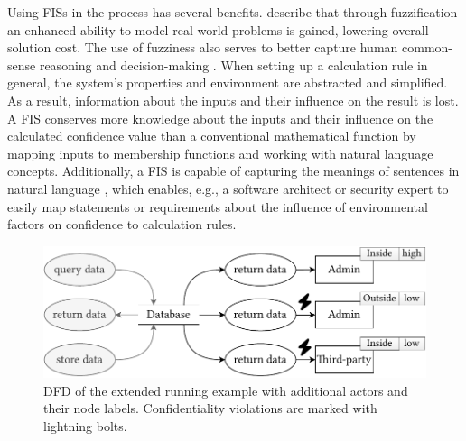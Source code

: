 Using \acp{FIS} in the process has several benefits. 
\textcite{klir_fuzzy_1995} describe that through fuzzification an enhanced ability to model real-world problems is gained, lowering overall solution cost. 
The use of fuzziness also serves to better capture human common-sense reasoning and decision-making \cite{klir_fuzzy_1995}. 
When setting up a calculation rule in general, the system's properties and environment are abstracted and simplified. 
As a result, information about the inputs and their influence on the result is lost. 
A \ac{FIS} conserves more knowledge about the inputs and their influence on the calculated confidence value than a conventional mathematical function by mapping inputs to membership functions and working with natural language concepts. 
Additionally, a \ac{FIS} is capable of capturing the meanings of sentences in natural language \cite{klir_fuzzy_1995}, which enables, e.g., a software architect or security expert to easily map statements or requirements about the influence of environmental factors on confidence to calculation rules.

\begin{figure}
    \centering
    \includegraphics[width=0.95\linewidth]{figures/chapter7/dfd-environmental.pdf}
    \caption{\acf*{DFD} of the extended running example with additional actors and their node labels. Confidentiality violations are marked with lightning bolts.}
    \label{fig:confidentialityanalysis:dfdenvironment}
\end{figure}

